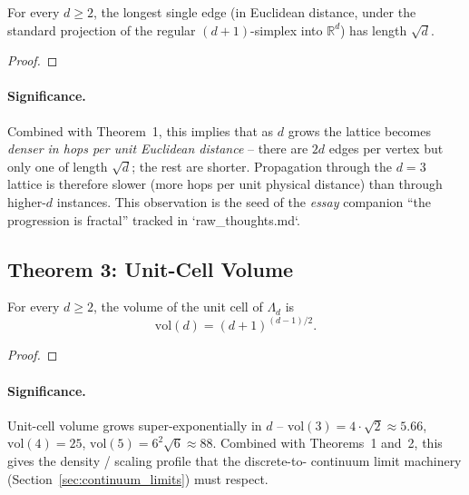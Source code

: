 \begin{theorem}
\label{thm:max_hop}
For every $d \geq 2$, the longest single edge (in Euclidean distance,
under the standard projection of the regular $(d+1)$-simplex into
$\mathbb{R}^d$) has length $\sqrt{d}$.
\end{theorem}

\begin{proof}
\end{proof}

\paragraph{Significance.}
Combined with Theorem~1, this implies that as $d$ grows the lattice
becomes \emph{denser in hops per unit Euclidean distance} -- there
are $2d$ edges per vertex but only one of length $\sqrt{d}$; the rest
are shorter.  Propagation through the $d = 3$ lattice is therefore
slower (more hops per unit physical distance) than through higher-$d$
instances.  This observation is the seed of the \emph{essay}
companion ``the progression is fractal'' tracked in `raw_thoughts.md`.

\subsection{Theorem 3: Unit-Cell Volume}
\label{subsec:theorem_3}

\begin{theorem}
\label{thm:unit_cell_volume}
For every $d \geq 2$, the volume of the unit cell of $\Lambda_d$ is
\begin{equation*}
\text{vol}(d) = (d+1)^{(d-1)/2}.
\end{equation*}
\end{theorem}

\begin{proof}
\end{proof}

\paragraph{Significance.}
Unit-cell volume grows super-exponentially in $d$ -- $\text{vol}(3)
= 4 \cdot \sqrt{2} \approx 5.66$, $\text{vol}(4) = 25$,
$\text{vol}(5) = 6^2 \sqrt{6} \approx 88$.  Combined with Theorems~1
and~2, this gives the density / scaling profile that the discrete-to-
continuum limit machinery (Section~\ref{sec:continuum_limits})
must respect.

